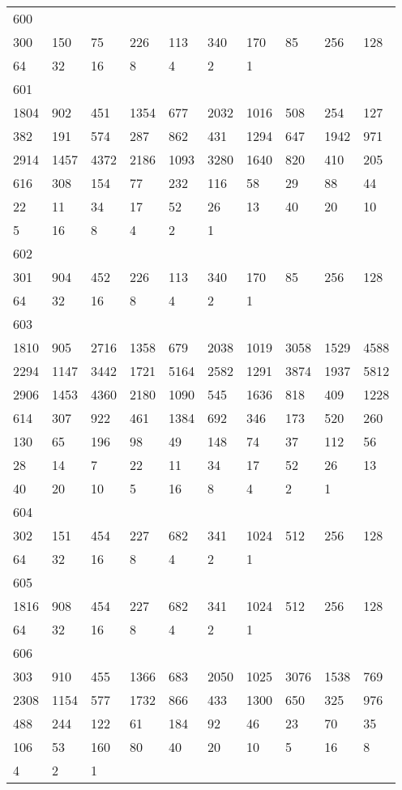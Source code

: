 \begin{longtable}{*{10}{l}}
600&&&&&&&&&\\
300& 150& 75& 226& 113& 340& 170& 85& 256& 128\\
64& 32& 16& 8& 4& 2& 1& \\

601&&&&&&&&&\\
1804& 902& 451& 1354& 677& 2032& 1016& 508& 254& 127\\
382& 191& 574& 287& 862& 431& 1294& 647& 1942& 971\\
2914& 1457& 4372& 2186& 1093& 3280& 1640& 820& 410& 205\\
616& 308& 154& 77& 232& 116& 58& 29& 88& 44\\
22& 11& 34& 17& 52& 26& 13& 40& 20& 10\\
5& 16& 8& 4& 2& 1& \\

602&&&&&&&&&\\
301& 904& 452& 226& 113& 340& 170& 85& 256& 128\\
64& 32& 16& 8& 4& 2& 1& \\

603&&&&&&&&&\\
1810& 905& 2716& 1358& 679& 2038& 1019& 3058& 1529& 4588\\
2294& 1147& 3442& 1721& 5164& 2582& 1291& 3874& 1937& 5812\\
2906& 1453& 4360& 2180& 1090& 545& 1636& 818& 409& 1228\\
614& 307& 922& 461& 1384& 692& 346& 173& 520& 260\\
130& 65& 196& 98& 49& 148& 74& 37& 112& 56\\
28& 14& 7& 22& 11& 34& 17& 52& 26& 13\\
40& 20& 10& 5& 16& 8& 4& 2& 1& \\

604&&&&&&&&&\\
302& 151& 454& 227& 682& 341& 1024& 512& 256& 128\\
64& 32& 16& 8& 4& 2& 1& \\

605&&&&&&&&&\\
1816& 908& 454& 227& 682& 341& 1024& 512& 256& 128\\
64& 32& 16& 8& 4& 2& 1& \\

606&&&&&&&&&\\
303& 910& 455& 1366& 683& 2050& 1025& 3076& 1538& 769\\
2308& 1154& 577& 1732& 866& 433& 1300& 650& 325& 976\\
488& 244& 122& 61& 184& 92& 46& 23& 70& 35\\
106& 53& 160& 80& 40& 20& 10& 5& 16& 8\\
4& 2& 1& \\


\end{longtable}
